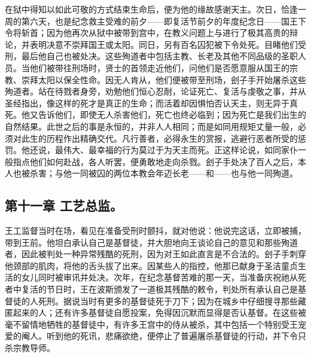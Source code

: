 在狱中得知以如此可敬的方式结束生命后，便为他的缘故感谢天主。次日，恰逢一周的第六天，也是纪念救主受难的前夕——即复活节前夕的年度纪念日——国王下令将斩首；因为他再次从狱中被带到宫中，在教义问题上与进行了极其高贵的辩论，并表明决意不崇拜国王或太阳。同日，另有百名囚犯被下令处死。目睹他们受刑，最后他自己也被处决。这些殉道者中包括主教、长老及其他不同品级的圣职人员。当他们被带往刑场时，贤士的首领走近他们，问他们是否愿意服从国王的宗教、崇拜太阳以保全性命。因无人肯从，他们便被带至刑场，刽子手开始屠杀这些殉道者。站在待戮者身旁，劝勉他们恒心忍耐，论证死亡、复活与虔敬之事，并从圣经指出，像这样的死才是真正的生命；而活着却因惧怕否认天主，则无异于真死。他又告诉他们，即使无人杀害他们，死亡也终必临到；因为死亡是我们出生的自然结果。此世之后的事是永恒的，并非人人相同；而是如同用规矩丈量一般，必须对此生的历程作出精确交代。凡行善者，必得永生的赏报，逃避行恶者所受的惩罚。他还说，最伟大、最幸福的行为莫过于为天主而死。正这样论说，如同家仆一般指点他们如何赴战，各人听罢，便勇敢地走向杀戮。刽子手处决了百人之后，本人也被杀害；与他一同被囚的两位本教会年迈长老——和——也与他一同殉道。\par


\subsection{第十一章 工艺总监。}

王工监督当时在场，看见在准备受刑时颤抖，就对他说：他说完这话，立即被捕，带到王前。他坦白承认自己是基督徒，并大胆地向王谈论自己的意见和那些殉道者，因此被判处一种异常残酷的死刑，因为对王如此直言是不合法的。刽子手刺穿他颈部的肌肉，将他的舌头拔了出来。因某些人的指控，他那已献身于圣洁童贞生活的女儿同时被审讯并处决。次年，在纪念基督苦难的那一天，当准备庆祝祂从死者中复活的节日时，王在波斯颁发了一道极其残酷的敕令，判处所有承认自己是基督徒的人死刑。据说当时有更多的基督徒死于刀下；因为在城乡中仔细搜寻那些藏匿起来的人；还有许多基督徒自愿投案，免得因沉默而显得是否认基督。在这些被毫不留情地牺牲的基督徒中，有许多王宫中的侍从被杀，其中包括一个特别受王宠爱的阉人。听到他的死讯，悲痛欲绝，便停止了普遍屠杀基督徒的行动，并下令只杀宗教导师。\par

